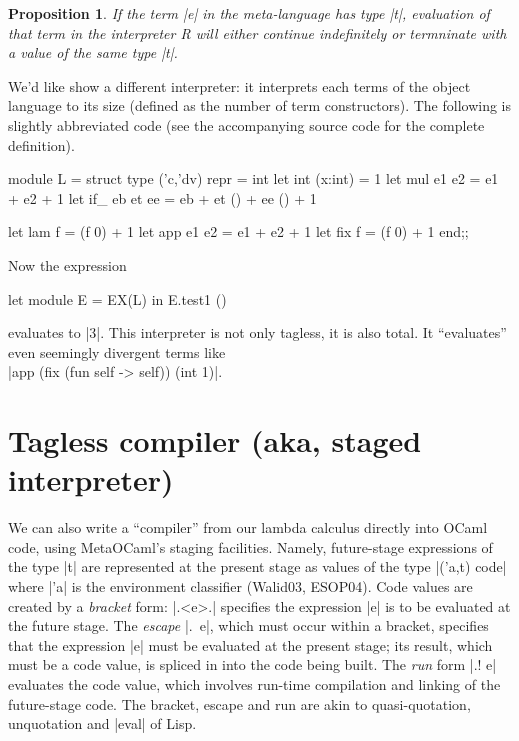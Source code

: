 \documentclass[preprint]{sigplanconf}
\newtheorem{prop}{Proposition}
\begin{document}
\begin{prop}
If the term |e| in the meta-language has type
|t|, evaluation of that term in the interpreter R will either continue
indefinitely or termninate with a value of the same type |t|.
\end{prop}

We'd like show a different interpreter: it interprets each terms of
the object language to its size (defined as the number of term
constructors). The following is slightly abbreviated code (see the
accompanying source code for the complete definition).
 
\begin{code}
module L = struct
  type ('c,'dv) repr = int
  let int (x:int) = 1
  let mul e1 e2 = e1 + e2 + 1
  let if_ eb et ee = eb + et () + ee () + 1

  let lam f = (f 0) + 1
  let app e1 e2 = e1 + e2 + 1
  let fix f = (f 0) + 1
end;;
\end{code}

\noindent Now the expression
\begin{code}
  let module E = EX(L) in E.test1 ()
\end{code}
evaluates to |3|. This interpreter is not only tagless, it is also
total. It ``evaluates'' even seemingly divergent terms like\\
|app (fix (fun self -> self)) (int 1)|.

\begin{comment}
module EX1(S: Symantics) = struct
 open S
 let tfix () = app (fix (fun self -> self)) (int 1)
end;;
let module E =EX1(R) in E.tfix ();;
let module E =EX1(L) in E.tfix ();;
\end{comment}

\section{Tagless compiler (aka, staged interpreter)}\label{compiler}

We can also write a ``compiler'' from our lambda calculus directly
into OCaml code, using MetaOCaml's staging facilities. Namely,
future-stage expressions of the type |t| are represented at the
present stage as values of the type |('a,t) code| where |'a| is the
environment classifier (Walid03, ESOP04). Code values are created by
a \emph{bracket} form: |.<e>.| specifies the expression |e| is to be
evaluated at the future stage. The \emph{escape} |.~e|, which must occur
within a bracket, specifies that the expression |e| must be evaluated
at the present stage; its result, which must be a code value, is
spliced in into the code being built. The \emph{run} form |.! e|
evaluates the code value, which involves run-time compilation and
linking of the future-stage code. The bracket, escape and run are akin to
quasi-quotation, unquotation and |eval| of Lisp.
\end{document}
